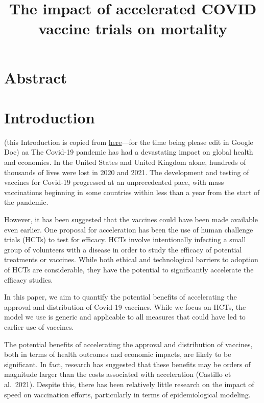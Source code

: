 \documentclass{article}
\title{The impact of accelerated COVID vaccine trials on mortality}
\author{
  }
\begin{document}
\maketitle


\begin{abstract}

\end{abstract}


\hypertarget{abstract}{%
\section{Abstract}\label{abstract}}

\hypertarget{introduction}{%
\section{Introduction}\label{introduction}}

(this Introduction is copied from \href{https://docs.google.com/document/d/1YzVLaFWor03Y3jq8IBe2iXEhLd7PNW9srnLAerAXOfg/edit}{here}---for the time being please edit in Google Doc)
aa
The Covid-19 pandemic has had a devastating impact on global health and economies. In the United States and United Kingdom alone, hundreds of thousands of lives were lost in 2020 and 2021. The development and testing of vaccines for Covid-19 progressed at an unprecedented pace, with mass vaccinations beginning in some countries within less than a year from the start of the pandemic.

However, it has been suggested that the vaccines could have been made available even earlier. One proposal for acceleration has been the use of human challenge trials (HCTs) to test for efficacy. HCTs involve intentionally infecting a small group of volunteers with a disease in order to study the efficacy of potential treatments or vaccines. While both ethical and technological barriers to adoption of HCTs are considerable, they have the potential to significantly accelerate the efficacy studies.

In this paper, we aim to quantify the potential benefits of accelerating the approval and distribution of Covid-19 vaccines. While we focus on HCTs, the model we use is generic and applicable to all measures that could have led to earlier use of vaccines.

The potential benefits of accelerating the approval and distribution of vaccines, both in terms of health outcomes and economic impacts, are likely to be significant. In fact, research has suggested that these benefits may be orders of magnitude larger than the costs associated with acceleration (Castillo et al.~2021). Despite this, there has been relatively little research on the impact of speed on vaccination efforts, particularly in terms of epidemiological modeling.
\end{document}
